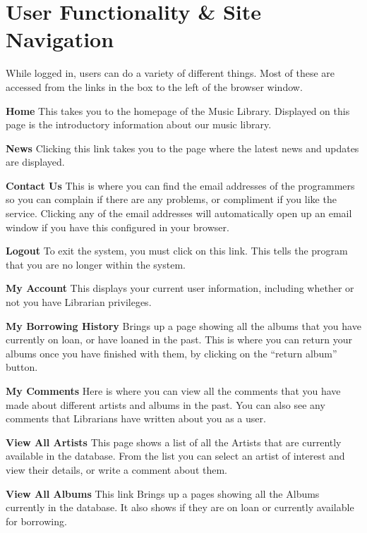 \documentclass{article}
\begin{document}
\section{User Functionality \& Site Navigation}
While logged in, users can do a variety of different things. Most of these are accessed from the links in the box to the left of the browser window.
\begin{description}
\item{\bf{Home}}
This takes you to the homepage of the Music Library. Displayed on this page is the introductory information about our music library.
\item{\bf{News}}
Clicking this link takes you to the page where the latest news and updates are displayed.
\item{\bf{Contact Us}}
This is where you can find the email addresses of the programmers so you can complain if there are any problems, or compliment if you like the service. Clicking any of the email addresses will automatically open up an email window if you have this configured in your browser.

\item{\bf{Logout}}
To exit the system, you must click on this link. This tells the program that you are no longer within the system.
\item{\bf{My Account}}
This displays your current user information, including whether or not you have Librarian privileges.
\item{\bf{My Borrowing History}}
Brings up a page showing all the albums that you have currently on loan, or have loaned in the past. This is where you can return your albums once you have finished with them, by clicking on the ``return album'' button.
\item{\bf{My Comments}}
Here is where you can view all the comments that you have made about different artists and albums in the past. You can also see any comments that Librarians have written about you as a user.
\item{\bf{View All Artists}}
This page shows a list of all the Artists that are currently available in the database. From the list you can select an artist of interest and view their details, or write a comment about them.

\item{\bf{View All Albums}}
This link Brings up a pages showing all the Albums currently in the database. It also shows if they are on loan or currently available for borrowing.
\end{description}
\end{document}
